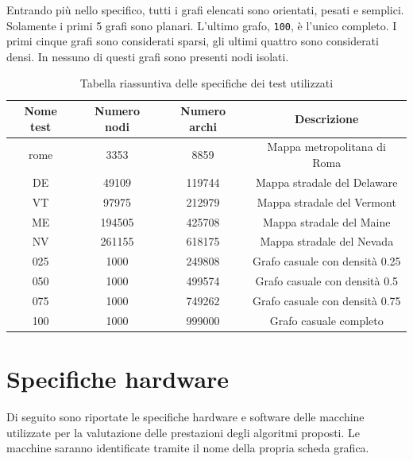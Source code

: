 \documentclass[12pt,a4paper]{book} %
\begin{document}
	Entrando più nello specifico, tutti i grafi elencati sono orientati, pesati e semplici. Solamente i primi 5 grafi sono planari. L'ultimo grafo, \texttt{100}, è l'unico completo. I primi cinque grafi sono considerati sparsi, gli ultimi quattro sono considerati densi. In nessuno di questi grafi sono presenti nodi isolati.
	\begin{table}[!ht]
		\centering
		\begin{tabular}{|c|c|c|c|}
			\hline
			\textbf{Nome test} & \textbf{Numero nodi} & \textbf{Numero archi} & \textbf{Descrizione} \\ \hline
			rome & 3353 & 8859 & Mappa metropolitana di Roma \\ \hline
			DE & 49109 & 119744 & Mappa stradale del Delaware \\ \hline
			VT & 97975 & 212979 & Mappa stradale del Vermont \\ \hline
			ME & 194505 & 425708 & Mappa stradale del Maine \\ \hline
			NV & 261155 & 618175 & Mappa stradale del Nevada \\ \hline
			025 & 1000 & 249808 & Grafo casuale con densità 0.25 \\ \hline
			050 & 1000 & 499574 & Grafo casuale con densità 0.5 \\ \hline
			075 & 1000 & 749262 & Grafo casuale con densità 0.75 \\ \hline
			100 & 1000 & 999000 & Grafo casuale completo \\ \hline
		\end{tabular}
		\caption{Tabella riassuntiva delle specifiche dei test utilizzati}
		\label{tab:riassunto_test}
	\end{table}
	
	\section{Specifiche hardware}
	Di seguito sono riportate le specifiche hardware e software delle macchine utilizzate per la valutazione delle prestazioni degli algoritmi proposti. Le macchine saranno identificate tramite il nome della propria scheda grafica.
	
\end{document}
